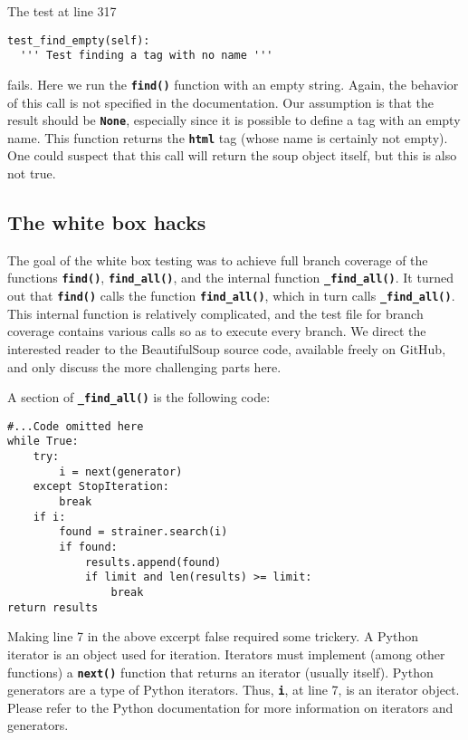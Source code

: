 \documentclass[10pt]{article}
\newcommand{\tbt}[1]{\texttt{\textbf{#1}}}
\begin{document}
\noindent\begin{minipage}{\textwidth}
\indent{\hspace{12pt}} The test at line 317
\begin{lstlisting}[style = pythonstyle]
test_find_empty(self):
  ''' Test finding a tag with no name '''
\end{lstlisting}
\end{minipage}
fails. Here we run the \tbt{find()} function with an empty string. Again, the behavior of this call is not specified in the documentation. Our assumption is that the result should be \tbt{None}, especially since it is possible to define a tag with an empty name. This function returns the \tbt{html} tag (whose name is certainly not empty). One could suspect that this call will return the soup object itself, but this is also not true. 

\subsection{The white box hacks}

The goal of the white box testing was to achieve full branch coverage of the functions \tbt{find()}, \tbt{find\_all()}, and the internal function \tbt{\_find\_all()}. It turned out that \tbt{find()} calls the function \tbt{find\_all()}, which in turn calls \tbt{\_find\_all()}. This internal function is relatively complicated, and the test file for branch coverage contains various calls so as to execute every branch. We direct the interested reader to the BeautifulSoup source code, available freely on GitHub, and only discuss the more challenging parts here. \\

\noindent\begin{minipage}{\textwidth}
\indent{\hspace{12pt}} A section of \tbt{\_find\_all()} is the following code:
\begin{lstlisting}[style = pythonstyle-with-numbers]
#...Code omitted here
while True:
    try:
        i = next(generator)
    except StopIteration:
        break
    if i:
        found = strainer.search(i)
        if found:
            results.append(found)
            if limit and len(results) >= limit:
                break
return results
\end{lstlisting}
\end{minipage}

Making line 7 in the above excerpt false required some trickery. A Python iterator is an object used for iteration. Iterators must implement (among other functions) a \tbt{next()} function that returns an iterator (usually itself). Python generators are a type of Python iterators. Thus, \tbt{i}, at line 7, is an iterator object. Please refer to the Python documentation for more information on iterators and generators. 
\end{document}
